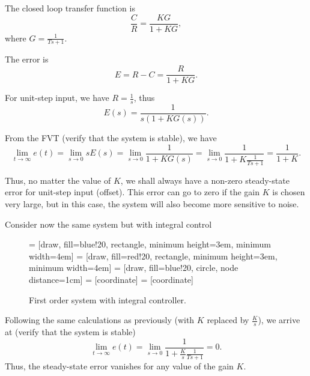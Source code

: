 \documentclass[a4paper,11pt]{report}
\theoremstyle{definition}
\begin{document}
The closed loop transfer function is
\[
\frac{C}{R} = \frac{KG}{1+KG},
\]
where $G=\frac{1}{Ts+1}$.

The error is
\[
E = R-C = \frac{R}{1+KG}.
\]

For unit-step input, we have $R=\frac{1}{s}$, thus
\[
E(s) = \frac{1}{s(1+KG(s))}.
\]

From the FVT (verify that the system is stable), we have
\[
\lim_{t\to\infty}e(t) = \lim_{s\to 0}sE(s) = \lim_{s\to
  0}\frac{1}{1+KG(s)} = \lim_{s\to
  0}\frac{1}{1+K\frac{1}{Ts+1}}=\frac{1}{1+K}. 
\]

Thus, no matter the value of $K$, we shall always have a non-zero
steady-state error for unit-step input (offset). This error can go to
zero if the gain $K$ is chosen very large, but in this case, the
system will also become more sensitive to noise.

Consider now the same system but with integral control
\begin{figure}[H]
  \label{fig:integral}
  \centering
   = [draw, fill=blue!20, rectangle, minimum height=3em, minimum width=4em]
   = [draw, fill=red!20, rectangle, minimum height=3em, minimum width=4em]
   = [draw, fill=blue!20, circle, node distance=1cm]
   = [coordinate]
   = [coordinate]
  \caption{First order system with integral controller.}
\end{figure}

Following the same calculations as previously (with $K$ replaced by
$\frac{K}{s}$), we arrive at (verify that the system is stable)
\[
\lim_{t\to\infty}e(t) = \lim_{s\to
  0}\frac{1}{1+\frac{K}{s}\frac{1}{Ts+1}} = 0.
\]
Thus, the steady-state error vanishes for any value of the gain $K$.
\end{document}
